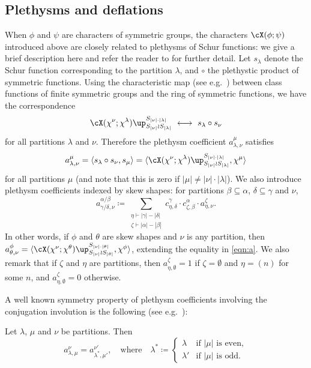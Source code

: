 \subsection{Plethysms and deflations}\label{sec:plethysm-deflation}
When $\phi$ and $\psi$ are characters of symmetric groups, the characters $\cX(\phi;\psi)$ introduced above are closely related to plethysms of Schur functions: we give a brief description here and refer the reader to \cite{dBPW, Mac, Stanley} for further detail. Let $s_\lambda$ denote the Schur function corresponding to the partition $\lambda$, and $\circ$ the plethystic product of symmetric functions. Using the characteristic map (see e.g.~\cite[Chapter 7]{Stanley}) between class functions of finite symmetric groups and the ring of symmetric functions, we have the correspondence
\[ \cX(\chi^\nu;\chi^\lambda)\up_{S_{|\nu|}\wr S_{|\lambda|}}^{S_{|\nu|\cdot|\lambda|}}\ \longleftrightarrow\ s_\lambda\circ s_\nu \]
for all partitions $\lambda$ and $\nu$. Therefore the plethysm coefficient $a^\mu_{\lambda,\nu}$ satisfies
\begin{equation}\label{eqn:a}
	a^\mu_{\lambda,\nu} = \langle s_\lambda\circ s_\nu, s_\mu\rangle = \langle \cX(\chi^\nu;\chi^\lambda)\up_{S_{|\nu|}\wr S_{|\lambda|}}^{S_{|\nu|\cdot|\lambda|}}, \chi^\mu \rangle	
\end{equation}
for all partitions $\mu$ (and note that this is zero if $|\mu|\ne|\nu|\cdot|\lambda|$). 
We also introduce plethysm coefficients indexed by skew shapes: for partitions $\beta\subseteq\alpha$, $\delta\subseteq\gamma$ and $\nu$,
\begin{equation}\label{eqn:skew-plethysm}
	a^{\alpha/\beta}_{\gamma/\delta,\nu}\coloneqq  \sum_{\substack{\eta\vdash|\gamma|-|\delta|\\\zeta\vdash|\alpha|-|\beta|}} c^\gamma_{\eta,\delta}\cdot c^\alpha_{\zeta,\beta}\cdot a^\zeta_{\eta,\nu}.
\end{equation}
In other words, if $\phi$ and $\theta$ are skew shapes and $\nu$ is any partition, then $a^\phi_{\theta,\nu} = \langle \cX(\chi^\nu; \chi^\theta)\up_{S_{|\nu|}\wr S_{|\theta|}}^{S_{|\nu|\cdot|\theta|}}, \chi^\phi\rangle$, extending the equality in \eqref{eqn:a}. We also remark that if $\zeta$ and $\eta$ are partitions, then $a^\zeta_{\eta,\emptyset}=1$ if $\zeta=\emptyset$ and $\eta=(n)$ for some $n$, and $a^\zeta_{\eta,\emptyset}=0$ otherwise. 

A well known symmetry property of plethysm coefficients involving the conjugation involution is the following (see e.g.~\cite[Ex.~1, Ch. I.8]{Mac}):
\begin{lemma}\label{lem:conj-plethysm}
	Let $\lambda$, $\mu$ and $\nu$ be partitions. Then
	\[ a^\nu_{\lambda,\mu} = a^{\nu'}_{\lambda^\ast,\mu'},\quad\text{where}\quad \lambda^\ast\coloneqq \begin{cases} \lambda & \text{if $|\mu|$ is even},\\ \lambda' & \text{if $|\mu|$ is odd}.\end{cases} \]
\end{lemma}

